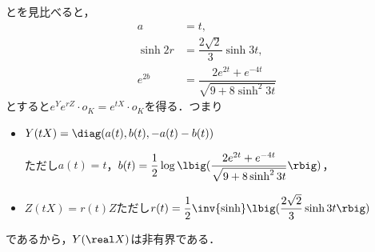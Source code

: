 \begin{npfwn}
  とを見比べると，
  \begin{align*}
    a &= t,\\
    \sinh 2r &= \dfrac{2\sqrt{2}}{3}\sinh 3t, \\
    e^{2b} &= \dfrac{2e^{2t} + e^{-4t}}{\sqrt{9 + 8\sinh^2 3t}}
  \end{align*}
  とすると$e^{Y}e^{rZ}\cdot o_K = e^{tX}\cdot o_K $を得る．つまり
  \begin{itemize}
  \item $Y(tX) = \diag(a(t) ,b(t) ,-a(t) -b(t) ) $

    ただし$a(t) = t$，$b(t) =\dfrac{1}{2} \log \lbig(\dfrac{2e^{2t} + e^{-4t}}{\sqrt{9 + 8\sinh^2 3t}}\rbig) $，
  \item $Z(tX) = r(t)Z  $ただし$r(t) = \dfrac{1}{2} \inv{\sinh}\lbig( \dfrac{2\sqrt{2}}{3}\sinh 3t\rbig) $
  \end{itemize}
  であるから，$Y(\real X) $は非有界である．  
\end{npfwn}
